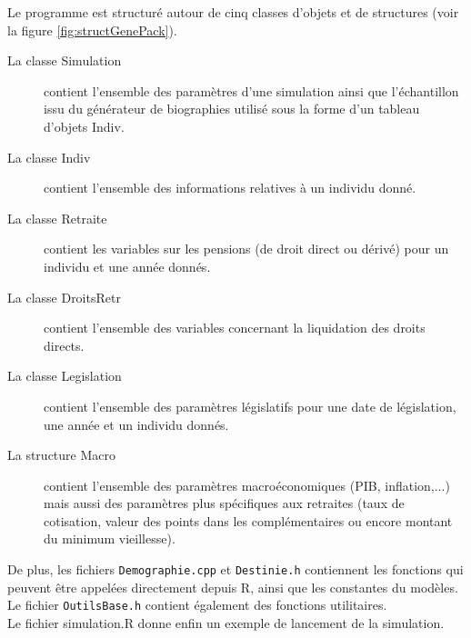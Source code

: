 Le programme est structuré autour de cinq classes d'objets et de structures (voir la figure \ref{fig:structGenePack}).\\
\begin{description}
\item[La classe Simulation] contient l'ensemble des paramètres d'une simulation ainsi que 
l'échantillon issu du générateur de biographies
utilisé sous la forme d'un tableau d'objets Indiv.
\item[La classe Indiv] contient l'ensemble des informations relatives à un individu donné.
\item[La classe Retraite] contient les variables sur les pensions (de droit direct ou dérivé) 
pour un individu et une année donnés.
\item[La classe DroitsRetr] contient l'ensemble des variables concernant la liquidation des
droits directs.
\item[La classe Legislation] contient l'ensemble des paramètres législatifs pour une date de législation, une année et un individu donnés. 
\item[La structure Macro] contient l'ensemble des paramètres macroéconomiques (PIB, inflation,...) mais aussi des 
paramètres plus spécifiques aux retraites (taux de cotisation, valeur des points dans les complémentaires ou encore montant du minimum vieillesse).
\end{description}

De plus, les fichiers {\tt Demographie.cpp}  et {\tt Destinie.h} contiennent les fonctions qui peuvent être appelées directement depuis R,
ainsi que les constantes du modèles.
Le fichier {\tt OutilsBase.h} contient également des fonctions utilitaires.\\

Le fichier simulation.R donne enfin un exemple de lancement de la simulation.



\phantom{sdfgsdgf
sdfgsdg}

\medskip 

